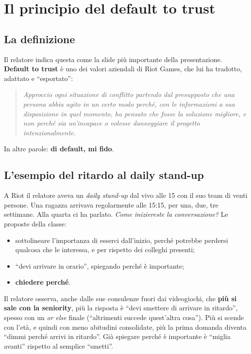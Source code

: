 \section{Il principio del default to trust}
\label{sec:z1-default-trust}

\subsection{La definizione}

Il relatore indica questa come la slide più importante della presentazione.
\textbf{Default to trust} è uno dei valori aziendali di Riot Games, che lui ha
tradotto, adattato e ``esportato'':

\begin{quote}
  \emph{Approccio ogni situazione di conflitto partendo dal presupposto che una
  persona abbia agito in un certo modo perché, con le informazioni a sua
  disposizione in quel momento, ha pensato che fosse la soluzione migliore, e
  non perché sia un'incapace o volesse danneggiare il progetto
  intenzionalmente.}
\end{quote}

In altre parole: \textbf{di default, mi fido}.

\subsection{L'esempio del ritardo al daily stand-up}

A Riot il relatore aveva un \emph{daily stand-up} dal vivo alle 15 con il suo
team di venti persone. Una ragazza arrivava regolarmente alle 15:15, per una,
due, tre settimane. Alla quarta ci ha parlato. \emph{Come iniziereste la
conversazione?} Le proposte della classe:
\begin{itemize}
  \item sottolineare l'importanza di esserci dall'inizio, perché potrebbe
        perdersi qualcosa che le interessa, e per rispetto dei colleghi
        presenti;
  \item ``devi arrivare in orario'', spiegando perché è importante;
  \item \textbf{chiedere perché}.
\end{itemize}

Il relatore osserva, anche dalle sue consulenze fuori dai videogiochi, che
\textbf{più si sale con la seniority}, più la risposta è ``devi smettere di
arrivare in ritardo'', spesso con un \emph{or else} finale (``altrimenti
succede quest'altra cosa''). Più si scende con l'età, e quindi con meno
abitudini consolidate, più la prima domanda diventa ``dimmi perché arrivi in
ritardo''. Già spiegare perché è importante è ``miglia avanti'' rispetto al
semplice ``smetti''.

